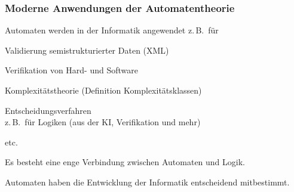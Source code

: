     \begin{frame}
      \frametitle{Moderne Anwendungen der Automatentheorie}
    
      Automaten werden in der Informatik angewendet z.\,B.\ für
      
      \begin{Itemize}
        \item
          Validierung semistrukturierter Daten (XML)
        \item
          Verifikation von Hard- und Software
        \item
          Komplexitätstheorie (Definition Komplexitätsklassen)
        \item
          Entscheidungsverfahren \\
          z.\,B.\ für Logiken (aus der KI, Verifikation und mehr)
        \item
          etc.\
      \end{Itemize}
    
      \par\medskip
      Es besteht eine enge Verbindung zwischen Automaten und Logik.
      
      \par\medskip
      Automaten haben die Entwicklung der Informatik entscheidend mitbestimmt.

    \end{frame}

